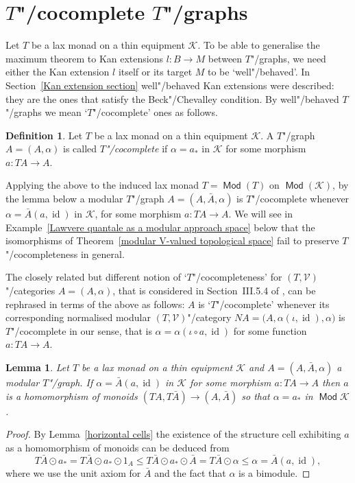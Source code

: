 \documentclass[preprint, a4paper]{elsarticle}
\newtheorem{lemma}[theorem]{Lemma}
\theoremstyle{definition}
\newtheorem{definition}[theorem]{Definition}
\theoremstyle{remark}
\providecommand{\exref}[1]{Example~\ref{#1}}
\providecommand{\lemref}[1]{Lemma~\ref{#1}}
\providecommand{\thmref}[1]{Theorem~\ref{#1}}
\providecommand{\secref}[1]{Section~\ref{#1}}
\providecommand{\of}{\circ}
\providecommand{\bigpars}[1]{\bigl(#1\bigr)}
\providecommand{\map}[3]{#1\colon#2\to#3}
\DeclareMathOperator{\id}{id}
\providecommand{\catvar}[1]{\mathcal{#1}}
\providecommand{\2}{\mathsf 2}
\providecommand{\K}{\catvar K}
\providecommand{\V}{\catvar V}
\DeclareMathOperator{\Mod}{\mathsf{Mod}}
\providecommand{\hc}{\odot}
\begin{document}
	\section{\texorpdfstring{$T$}{T}"/cocomplete \texorpdfstring{$T$}{T}"/graphs} \label{T-complete T-graphs}
	Let $T$ be a lax monad on a thin equipment $\K$. To be able to generalise the maximum theorem to Kan extensions $\map lBM$ between $T$"/graphs, we need either the Kan extension $l$ itself or its target $M$ to be `well"/behaved'. In \secref{Kan extension section} well"/behaved Kan extensions were described: they are the ones that satisfy the Beck"/Chevalley condition. By well"/behaved $T$"/graphs we mean `$T$"/cocomplete' ones as follows.
	\begin{definition} \label{complete}
		Let $T$ be a lax monad on a thin equipment $\K$. A $T$"/graph $A = (A, \alpha)$ is called \emph{$T$"/cocomplete} if $\alpha = a_*$ in $\K$ for some morphism $\map a{TA}A$.
	\end{definition}
	Applying the above to the induced lax monad $T = \Mod(T)$ on $\Mod(\K)$, by the lemma below a modular $T$"/graph $A = (A, \bar A, \alpha)$ is $T$"/cocomplete whenever $\alpha = \bar A(a, \id)$ in $\K$, for some morphism $\map a{TA}A$. We will see in \exref{Lawvere quantale as a modular approach space} below that the isomorphisms of \thmref{modular V-valued topological space} fail to preserve $T$"/cocompleteness in general.
	
	The closely related but different notion of `$T$"/cocompleteness' for $(T, \V)$"/categories $A = (A, \alpha)$, that is considered in Section~III.5.4 of \cite{Hofmann-Seal-Tholen14}, can be rephrased in terms of the above as follows: $A$ is `$T$"/cocomplete' whenever its corresponding normalised modular $(T, \V)$"/category $NA = \bigpars{A, \alpha(\iota, \id), \alpha}$ is $T$"/cocomplete in our sense, that is $\alpha = \alpha(\iota \of a, \id)$ for some function $\map a{TA}A$.
	\begin{lemma}
		Let $T$ be a lax monad on a thin equipment $\K$ and $A = (A, \bar A, \alpha)$ a modular $T$"/graph. If $\alpha = \bar A (a, \id)$ in $\K$ for some morphism $\map a{TA}A$ then $a$ is a homomorphism of monoids $(TA, T\bar A) \to (A, \bar A)$ so that $\alpha = a_*$ in $\Mod \K$.
	\end{lemma}
	\begin{proof}
		By \lemref{horizontal cells} the existence of the structure cell exhibiting $a$ as a homomorphism of monoids can be deduced from
		\begin{displaymath}
			T\bar A \hc a_* = T\bar A \hc a_* \hc 1_A \leq T\bar A \hc a_* \hc \bar A = T\bar A \hc \alpha \leq \alpha = \bar A(a, \id),
		\end{displaymath}
		where we use the unit axiom for $\bar A$ and the fact that $\alpha$ is a bimodule.
	\end{proof}
	
\end{document}
